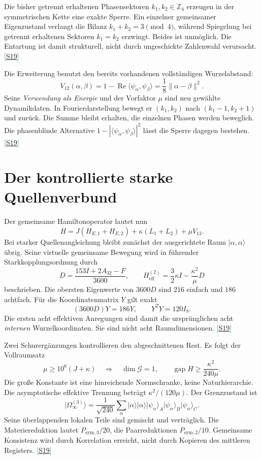 \documentclass[11pt,a4paper,oneside,parskip=half,headings=normal,numbers=noenddot,bibliography=totoc]{scrreprt}
\newcommand{\Z}{\mathbb Z}
\newcommand{\ket}[1]{\lvert #1\rangle}
\newcommand{\gap}{\operatorname{gap}}
\newcommand{\src}[1]{\textcolor{teal}{\small[\hyperref[s:#1]{S#1}]}}
\begin{document}
Die bisher getrennt erhaltenen Phasensektoren $k_1,k_2\in\Z_4$ erzeugen in der symmetrischen Kette eine exakte Sperre. Ein einzelner gemeinsamer Eigenzustand verlangt die Bilanz $k_1+k_2=3\pmod4$, während Spiegelung bei getrennt erhaltenen Sektoren $k_1=k_2$ erzwingt. Beides ist unmöglich. Die Entartung ist damit strukturell, nicht durch ungeschickte Zahlenwahl verursacht. \src{19}

Die Erweiterung benutzt den bereits vorhandenen vollständigen Wurzelabstand:
\[
 V_{12}(\alpha,\beta)=1-\operatorname{Re}\langle\psi_\alpha,\psi_\beta\rangle
 =\frac18\|\alpha-\beta\|^2.
\]
Seine \emph{Verwendung als Energie} und der Vorfaktor $\mu$ sind neu gewählte Dynamikdaten. In Fourierdarstellung bewegt er $(k_1,k_2)$ nach $(k_1-1,k_2+1)$ und zurück. Die Summe bleibt erhalten, die einzelnen Phasen werden beweglich. Die phasenblinde Alternative $1-|\langle\psi_\alpha,\psi_\beta\rangle|^2$ lässt die Sperre dagegen bestehen. \src{19}

\section{Der kontrollierte starke Quellenverbund}
Der gemeinsame Hamiltonoperator lautet nun
\[
 H=J(H_{E,1}+H_{E,2})+\kappa(L_1+L_2)+\mu V_{12}.
\]
Bei starker Quellenangleichung bleibt zunächst der ausgerichtete Raum $\ket{\alpha,\alpha}$ übrig. Seine virtuelle gemeinsame Bewegung wird in führender Starkkopplungsordnung durch
\[
 D=\frac{153I+2A_{32}-F}{3600},\qquad
 H_{\mathrm{eff}}^{(2)}=\frac32\kappa I-\frac{\kappa^2}{\mu}D
\]
beschrieben. Die obersten Eigenwerte von $3600D$ sind $216$ einfach und $186$ achtfach. Für die Koordinatenmatrix $Y$ gilt exakt
\[
 (3600D)Y=186Y,\qquad Y^TY=120I_8.
\]
Die ersten acht effektiven Anregungen sind damit die ursprünglichen acht \emph{internen} Wurzelkoordinaten. Sie sind nicht acht Raumdimensionen. \src{19}

Zwei Schurergänzungen kontrollieren den abgeschnittenen Rest. Es folgt der Vollraumsatz
\[
 \mu\ge10^6(J+\kappa)\quad\Longrightarrow\quad
 \dim\mathcal G=1,\qquad\gap H\ge\frac{\kappa^2}{240\mu}.
\]
Die große Konstante ist eine hinreichende Normschranke, keine Naturhierarchie. Die asymptotische effektive Trennung beträgt $\kappa^2/(120\mu)$. Der Grenzzustand ist
\[
 \ket{\Omega_\infty^{(3)}}=\frac1{\sqrt{240}}\sum_\alpha
 \ket\alpha\ket\alpha
 \ket{\psi_\alpha}_A\ket{\psi_\alpha}_B\ket{\psi_\alpha}_C.
\]
Seine überlappenden lokalen Teile sind gemischt und verträglich. Die Materiereduktion lautet $P_{\mathrm{sym},3}/20$, die Paarreduktionen $P_{\mathrm{sym},2}/10$. Gemeinsame Konsistenz wird durch Korrelation erreicht, nicht durch Kopieren des mittleren Registers. \src{19}
\end{document}
